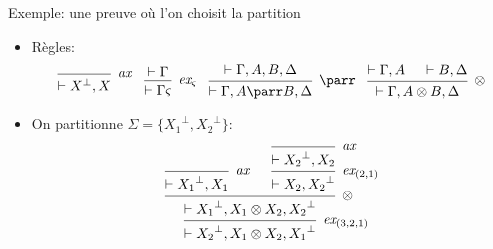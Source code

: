 \documentclass{beamer}
\newcommand*{\orth}{^\perp}
\newcommand*{\tensor}{\otimes}
\newcommand*{\hypv}[1]{\hypo{\vdash #1}}
\newcommand*{\axv}[1]{\infer{0}[\ensuremath{\mathit{ax}}]{\vdash #1}}
\newcommand*{\tensorv}[1]{\infer{2}[\ensuremath{\tensor}]{\vdash #1}}
\newcommand*{\parrv}[1]{\infer{1}[\ensuremath{\parr}]{\vdash #1}}
\newcommand*{\permv}[2]{\infer{1}[\ensuremath{\textit{ex}_{#1}}]{\vdash #2}}
\newcommand*{\permapp}[2]{#2 #1}
\newcommand*{\someperm}{\varsigma}
\newcommand*{\sequent}{\Gamma}
\newcommand*{\sequentbis}{\Delta}
\begin{document}
\begin{frame}{Exemple: une preuve où l'on choisit la partition}
    \begin{itemize}
        \item Règles: 
            \begin{equation*}
            \begin{prooftree}
              \axv{X\orth, X}
            \end{prooftree}
            \; \; \;
            \begin{prooftree}
              \hypv{\sequent}
              \permv{\someperm}{\permapp{\someperm}{\sequent}}
            \end{prooftree}
            \; \; \;
            \begin{prooftree}
              \hypv{\sequent, A, B, \sequentbis}
              \parrv{\sequent, A \parr B, \sequentbis}
            \end{prooftree}
            \; \; \;
            \begin{prooftree}
              \hypv{\sequent, A}
              \hypv{B, \sequentbis}
              \tensorv{\sequent, A \tensor B, \sequentbis}
            \end{prooftree}
            \end{equation*}
        \item On partitionne $\Sigma = \{{X_1}\orth, {X_2}\orth\}$:
        \begin{equation*}
        \begin{prooftree}
            \axv{{X_1}\orth, X_1}
            \axv{{X_2}\orth, X_2}
            \permv{(2, 1)}{X_2, {X_2}\orth}
            \tensorv{{X_1}\orth, X_1 \tensor X_2, {X_2}\orth}
            \permv{(3, 2, 1)}{{X_2}\orth, X_1 \tensor X_2, {X_1}\orth}
        \end{prooftree}
        \end{equation*}
    \end{itemize}
\end{frame}
\end{document}

